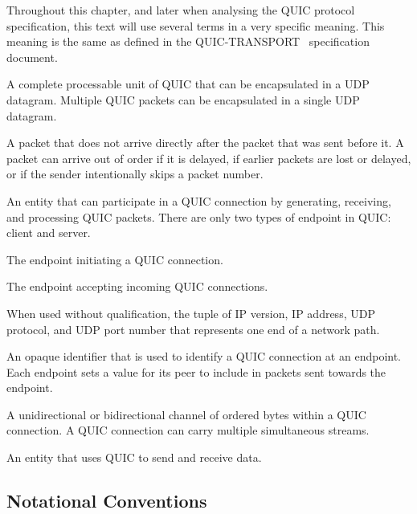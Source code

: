 Throughout this chapter, and later when analysing the QUIC protocol specification, this text will
use several terms in a very specific meaning. This meaning is the same as defined in the
QUIC-TRANSPORT~\cite{draft-ietf-quic-transport} specification document.


\begin{description}

    A complete processable unit of QUIC that can be
    encapsulated in a UDP datagram.  Multiple QUIC packets can be
    encapsulated in a single UDP datagram.

    A packet that does not arrive directly after the packet that was
    sent before it.  A packet can arrive out of order if it is delayed, if earlier packets are
    lost or delayed, or if the sender intentionally skips a packet number.

     An entity that can participate in a QUIC connection by
      generating, receiving, and processing QUIC packets.  There are
      only two types of endpoint in QUIC: client and server.

     The endpoint initiating a QUIC connection.

     The endpoint accepting incoming QUIC connections.

    When used without qualification, the tuple of IP version,
    IP address, UDP protocol, and UDP port number that represents one
    end of a network path.

    An opaque identifier that is used to identify a QUIC
    connection at an endpoint.  Each endpoint sets a value for its
    peer to include in packets sent towards the endpoint.

    A unidirectional or bidirectional channel of ordered bytes
    within a QUIC connection.  A QUIC connection can carry multiple
    simultaneous streams.

    An entity that uses QUIC to send and receive data.

\end{description}

\subsection{Notational Conventions}

